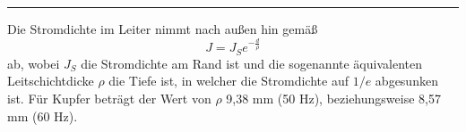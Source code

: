 \bigskip \hrule \bigskip

Die Stromdichte im Leiter nimmt nach außen hin gemäß
\begin{equation}
J = J_S e^{-\frac{d}{\rho}}
\end{equation}
ab, wobei $J_S$ die Stromdichte am Rand ist und die sogenannte äquivalenten Leitschichtdicke $\rho$ die Tiefe ist, in welcher die Stromdichte auf $1/e$ abgesunken ist. Für Kupfer beträgt der Wert von $\rho$ 9,38 mm (50 Hz), beziehungsweise 8,57 mm (60 Hz).
